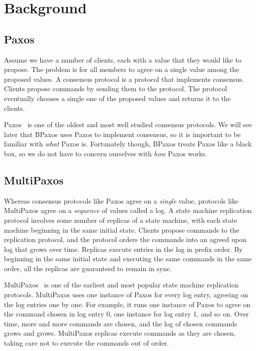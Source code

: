 \section{Background}

\subsection{Paxos}
Assume we have a number of clients, each with a value that they would like to
propose. The  problem is for all members to agree on a
single value among the proposed values. A consensus protocol is a protocol that
implements consensus. Clients propose commands by sending them to the protocol.
The protocol eventually chooses a single one of the proposed values and returns
it to the clients.

Paxos~\cite{lamport1998part, lamport2001paxos} is one of the oldest and most
well studied consensus protocols. We will see later that BPaxos uses Paxos to
implement consensus, so it is important to be familiar with \emph{what} Paxos
is. Fortunately though, BPaxos treats Paxos like a black box, so we do not have
to concern ourselves with \emph{how} Paxos works.

\subsection{MultiPaxos}
Whereas consensus protocols like Paxos agree on a \emph{single} value,
 protocols like MultiPaxos agree on a
\emph{sequence} of values called a log.  A state machine replication protocol
involves some number of replicas of a state machine, with each state machine
beginning in the same initial state. Clients propose commands to the
replication protocol, and the protocol orders the commands into an agreed upon
log that grows over time. Replicas execute entries in the log in prefix order.
By beginning in the same initial state and executing the same commands in the
same order, all the replicas are guaranteed to remain in sync.

MultiPaxos~\cite{van2015paxos} is one of the earliest and most popular state
machine replication protocols. MultiPaxos uses one instance of Paxos for every
log entry, agreeing on the log entries one by one. For example, it runs one
instance of Paxos to agree on the command chosen in log entry 0, one instance
for log entry 1, and so on. Over time, more and more commands are chosen, and
the log of chosen commands grows and grows. MultiPaxos replicas execute
commands as they are chosen, taking care not to execute the commands out of
order.

